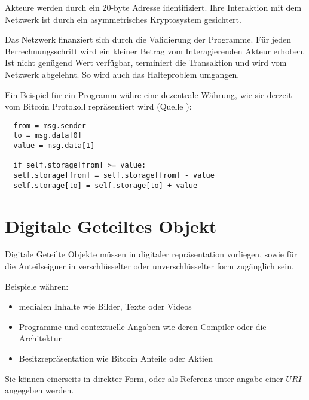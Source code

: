 \documentclass[]{article}
\begin{document}
Akteure werden durch ein 20-byte Adresse identifiziert. Ihre Interaktion mit dem Netzwerk ist durch ein asymmetrisches Kryptosystem gesichtert.

Das Netzwerk finanziert sich durch die Validierung der Programme. Für jeden Berrechnungsschritt wird ein kleiner Betrag vom Interagierenden Akteur erhoben. Ist nicht genügend Wert verfügbar, terminiert die Transaktion und wird vom Netzwerk abgelehnt. So wird auch das Halteproblem umgangen.

Ein Beispiel für ein Programm währe eine dezentrale Währung, wie sie derzeit vom Bitcoin Protokoll repräsentiert wird (Quelle \cite{Butterin2014}):




\begin{lstlisting}
  from = msg.sender
  to = msg.data[0]
  value = msg.data[1]

  if self.storage[from] >= value:
  self.storage[from] = self.storage[from] - value
  self.storage[to] = self.storage[to] + value
\end{lstlisting}



\newpage
\section{Digitale Geteiltes Objekt}

Digitale Geteilte Objekte müssen in digitaler repräsentation vorliegen, sowie für die Anteilseigner in verschlüsselter oder unverschlüsselter form zugänglich sein.

Beispiele währen: 

\begin{itemize}
  \item medialen Inhalte wie Bilder, Texte oder Videos
  \item Programme und contextuelle Angaben wie deren Compiler oder die Architektur
  \item Besitzrepräsentation wie Bitcoin Anteile oder Aktien
\end{itemize}


Sie können einerseits in direkter Form, oder als Referenz unter angabe einer $URI$ angegeben werden.
\end{document}

